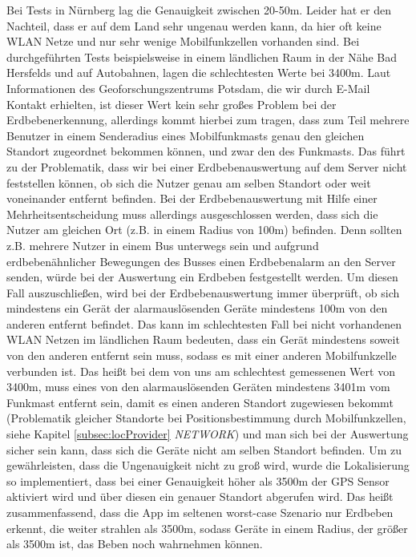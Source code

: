 Bei Tests in Nürnberg lag die Genauigkeit zwischen 20-50m. Leider hat er den Nachteil, dass er auf dem Land sehr ungenau werden kann, da hier oft keine WLAN Netze und nur sehr wenige Mobilfunkzellen vorhanden sind. Bei durchgeführten Tests beispielsweise in einem ländlichen Raum in der Nähe Bad Hersfelds und auf Autobahnen, lagen die schlechtesten Werte bei 3400m. Laut Informationen des Geoforschungszentrums Potsdam, die wir durch E-Mail Kontakt erhielten, ist dieser Wert kein sehr großes Problem bei der Erdbebenerkennung, allerdings kommt hierbei zum tragen, dass zum Teil mehrere Benutzer in einem Senderadius eines Mobilfunkmasts genau den gleichen Standort zugeordnet bekommen können, und zwar den des Funkmasts. Das führt zu der Problematik, dass wir bei einer Erdbebenauswertung auf dem Server nicht feststellen können, ob sich die Nutzer genau am selben Standort oder weit voneinander entfernt befinden. Bei der Erdbebenauswertung mit Hilfe einer Mehrheitsentscheidung muss allerdings ausgeschlossen werden, dass sich die Nutzer am gleichen Ort (z.B. in einem Radius von 100m) befinden. Denn sollten z.B. mehrere Nutzer in einem Bus unterwegs sein und aufgrund erdbebenähnlicher Bewegungen des Busses einen Erdbebenalarm an den Server senden, würde bei der Auswertung ein Erdbeben festgestellt werden. Um diesen Fall auszuschließen, wird bei der Erdbebenauswertung immer überprüft, ob sich mindestens ein Gerät der alarmauslösenden Geräte mindestens 100m von den anderen entfernt befindet. Das kann im schlechtesten Fall bei nicht vorhandenen WLAN Netzen im ländlichen Raum bedeuten, dass ein Gerät mindestens soweit von den anderen entfernt sein muss, sodass es mit einer anderen Mobilfunkzelle verbunden ist. Das heißt bei dem von uns am schlechtest gemessenen Wert von 3400m, muss eines von den alarmauslösenden Geräten mindestens 3401m vom Funkmast entfernt sein, damit es einen anderen Standort zugewiesen bekommt (Problematik gleicher Standorte bei Positionsbestimmung durch Mobilfunkzellen, siehe Kapitel \ref{subsec:locProvider} \textit{NETWORK}) und man sich bei der Auswertung sicher sein kann, dass sich die Geräte nicht am selben Standort befinden. Um zu gewährleisten, dass die Ungenauigkeit nicht zu groß wird, wurde die Lokalisierung so implementiert, dass bei einer Genauigkeit höher als 3500m der GPS Sensor aktiviert wird und über diesen ein genauer Standort abgerufen wird.
Das heißt zusammenfassend, dass die App im seltenen worst-case Szenario nur Erdbeben erkennt, die weiter strahlen als 3500m, sodass Geräte in einem Radius, der größer als 3500m ist, das Beben noch wahrnehmen können.
